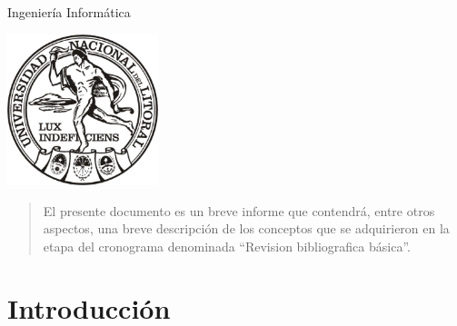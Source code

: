 \begin{titlepage}


  {\large
    Ingeniería Informática}\\[1cm] %
  
  \begin{center}
    \includegraphics[width=0.33\textwidth]{logo_unl.eps}\\[1cm] %
  \end{center}

  \vfill %

\end{titlepage}

\begin{abstract}
  El presente documento es un breve informe que contendrá, entre
  otros aspectos, una breve descripción de los conceptos que se
  adquirieron en la etapa del cronograma denominada ``Revision bibliografica básica''.
\end{abstract}

\section{Introducción}

